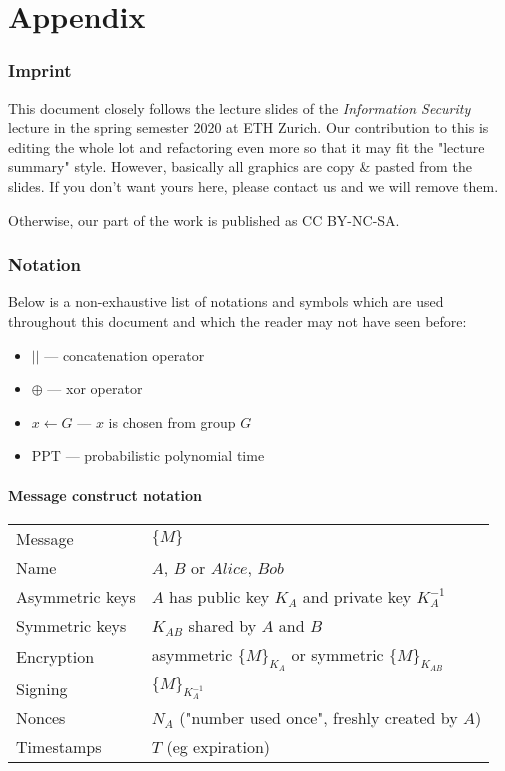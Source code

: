 %
%
\appendix

\part{Appendix}

\section{Imprint}

This document closely follows the lecture slides of the \textit{Information Security} lecture in the spring semester 2020 at ETH Zurich. Our contribution to this is editing the whole lot and refactoring even more so that it may fit the "lecture summary" style.
However, basically all graphics are copy \& pasted from the slides. If you don't want yours here, please contact us and we will remove them.

Otherwise, our part of the work is published as CC BY-NC-SA.

\begin{center}
\ccbyncsa
\end{center}

\section{Notation}

Below is a non-exhaustive list of notations and symbols which are used throughout this document and which the reader may not have seen before:

\begin{itemize}
    \item $||$ --- concatenation operator
    \item $\oplus$ --- xor operator
    \item $x \leftarrow G$ --- $x$ is chosen from group $G$
    \item PPT --- probabilistic polynomial time
\end{itemize}


\subsection{Message construct notation}

\begin{table}[h]
\centering
\begin{tabular}{ll}
Message & $\{ M \}$ \\
Name & $A$, $B$ or $Alice$, $Bob$ \\
Asymmetric keys &  $A$ has public key $K_A$ and private key $K_A^{-1}$ \\
Symmetric keys & $K_{AB}$ shared by $A$ and $B$ \\
Encryption &  asymmetric $\{ M \}_{K_A}$ or symmetric $\{ M \}_{K_{AB}}$ \\
Signing &  $\{ M \}_{K_A^{-1}}$\\
Nonces &  $N_A$ ("number used once", freshly created by $A$)\\
Timestamps & $T$ (eg expiration) \\
\end{tabular}
\end{table}

